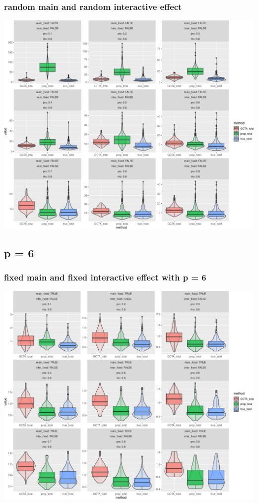 \documentclass[]{article}
\begin{document}
\subsubsection{random main and random interactive
effect}\label{random-main-and-random-interactive-effect}

\includegraphics{Simulation_report_chi_resamle_files/figure-latex/random random-1.pdf}

\subsection{p = 6}\label{p-6}

\subsubsection{fixed main and fixed interactive effect with p =
6}\label{fixed-main-and-fixed-interactive-effect-with-p-6}

\includegraphics{Simulation_report_chi_resamle_files/figure-latex/fixed fixed p 6-1.pdf}
\end{document}
